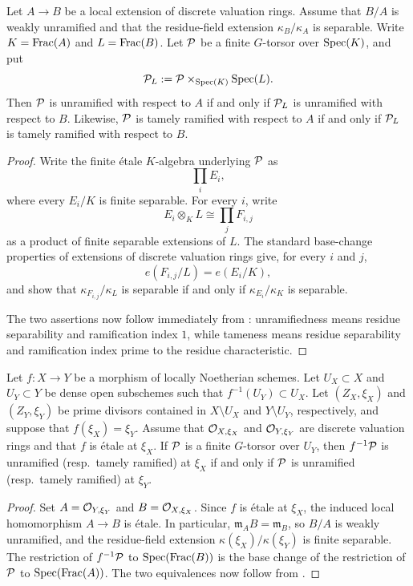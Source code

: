 \begin{lemma}\label{lemma:weakly_unramified_base_change}%
\label{lemma:descend_ramification_along_etale}
Let $A\to B$ be a local extension of discrete valuation rings. Assume that
$B/A$ is weakly unramified and that the residue-field extension
$\kappa_B/\kappa_A$ is separable. Write $K=\operatorname{Frac}(A)$ and $L=\operatorname{Frac}(B)$.
Let $\mathcal{P}$ be a finite $G$-torsor over $\operatorname{Spec}(K)$, and put
\[
    \mathcal{P}_L:=\mathcal{P}\times_{\operatorname{Spec}(K)}\operatorname{Spec}(L).
\]
Then $\mathcal{P}$ is unramified with respect to $A$ if and only if $\mathcal{P}_L$ is
unramified with respect to $B$. Likewise, $\mathcal{P}$ is tamely ramified with
respect to $A$ if and only if $\mathcal{P}_L$ is tamely ramified with respect to $B$.
\end{lemma}
\begin{proof}
Write the finite étale $K$-algebra underlying $\mathcal{P}$ as
\[
    \prod_i E_i,
\]
where every $E_i/K$ is finite separable. For every $i$, write
\[
    E_i\otimes_K L\cong\prod_j F_{i,j}
\]
as a product of finite separable extensions of $L$. The standard base-change
properties of extensions of discrete valuation rings give, for every $i$ and
$j$,
\[
    e(F_{i,j}/L)=e(E_i/K),
\]
and show that $\kappa_{F_{i,j}}/\kappa_L$ is separable if and only if
$\kappa_{E_i}/\kappa_K$ is separable.

The two assertions now follow immediately from
: unramifiedness means residue
separability and ramification index $1$, while tameness means residue
separability and ramification index prime to the residue characteristic.
\end{proof}

\begin{cor*}
Let $f:X\to Y$ be a morphism of locally Noetherian schemes. Let
$U_X\subset X$ and $U_Y\subset Y$ be dense open subschemes such that
$f^{-1}(U_Y)\subset U_X$. Let $(Z_X,\xi_X)$ and $(Z_Y,\xi_Y)$ be prime
divisors contained in $X\setminus U_X$ and $Y\setminus U_Y$, respectively,
and suppose that $f(\xi_X)=\xi_Y$. Assume that
$\mathcal{O}_{X,\xi_X}$ and $\mathcal{O}_{Y,\xi_Y}$ are discrete valuation rings and that
$f$ is étale at $\xi_X$. If $\mathcal{P}$ is a finite $G$-torsor over $U_Y$, then
$f^{-1}\mathcal{P}$ is unramified (resp.\ tamely ramified) at $\xi_X$ if and only if
$\mathcal{P}$ is unramified (resp.\ tamely ramified) at $\xi_Y$.
\end{cor*}
\begin{proof}
Set $A=\mathcal{O}_{Y,\xi_Y}$ and $B=\mathcal{O}_{X,\xi_X}$. Since $f$ is étale at
$\xi_X$, the induced local homomorphism $A\to B$ is étale. In particular,
$\mathfrak m_A B=\mathfrak m_B$, so $B/A$ is weakly unramified, and the
residue-field extension $\kappa(\xi_X)/\kappa(\xi_Y)$ is finite separable.
The restriction of $f^{-1}\mathcal{P}$ to $\operatorname{Spec}(\operatorname{Frac}(B))$ is the base change of
the restriction of $\mathcal{P}$ to $\operatorname{Spec}(\operatorname{Frac}(A))$. The two equivalences now
follow from .
\end{proof}

